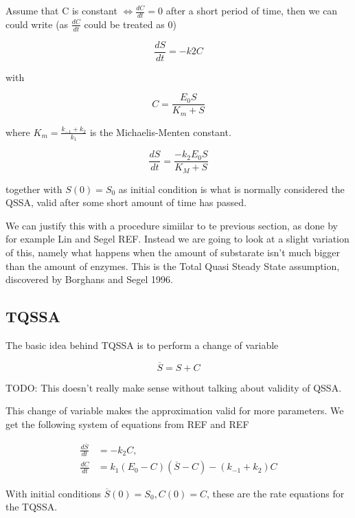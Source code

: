 \documentclass[12pt]{article}
\begin{document}
Assume that C is constant $\iff \frac{dC}{dt} = 0$ after a short period of time,
then we can could write (as $\frac{dC}{dt}$ could be treated as 0)

\begin{equation}
\frac{dS}{dt} = -k2 C
\end{equation}

with

\begin{equation}
C = \frac{E_0 S}{K_m +S}
\end{equation}

where $K_m = \frac{k_{-1} + k_2}{k_1}$ is the Michaelis-Menten constant.

\begin{equation}
\frac{dS}{dt} = \frac{-k_2 E_0 S}{K_M + S}
\end{equation}

together with $S(0) = S_0$ as initial condition is what is normally considered
the QSSA, valid after some short amount of time has passed.

We can justify this with a procedure simiilar to te previous section, as done by
for example Lin and Segel REF. Instead we are going to look at a slight
variation of this, namely what happens when the amount of substarate isn't much
bigger than the amount of enzymes. This is the Total Quasi Steady State
assumption, discovered by Borghans and Segel 1996.

\subsection{TQSSA}

The basic idea behind TQSSA is to perform a change of variable

\begin{equation}
\overline{S} = S + C
\end{equation}

TODO: This doesn't really make sense without talking about validity of QSSA.

This change of variable makes the approximation valid for more parameters. We
get the following system of equations from REF and REF

\begin{align}
\frac{d\overline{S}}{dt} &= - k_2 C, \\
\frac{dC}{dt} &= k_1(E_0-C)(\overline{S}-C)-(k_{-1}+ k_2) C
\end{align}

With initial conditions $\overline{S}(0)=S_0, C(0)=C$, these are the rate
equations for the TQSSA.
\end{document}
